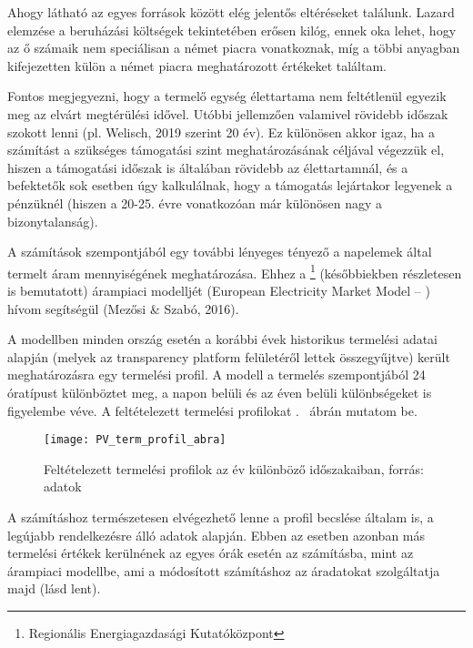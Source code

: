 \documentclass[twoside, magyar, showtrims]{corvinusphd}
\begin{document}

Ahogy látható az egyes források között
elég jelentős eltéréseket találunk.
Lazard elemzése a beruházási költségek
tekintetében erősen kilóg,
ennek oka lehet, hogy az ő számaik nem
speciálisan a német piacra vonatkoznak,
míg a többi anyagban kifejezetten külön
a német piacra meghatározott értékeket találtam. 

Fontos megjegyezni, hogy a termelő egység élettartama
nem feltétlenül egyezik meg az elvárt megtérülési idővel.
Utóbbi jellemzően valamivel rövidebb időszak
szokott lenni (pl. Welisch, 2019 szerint 20 év).
Ez különösen akkor igaz, ha a számítást a
szükséges támogatási szint meghatározásának céljával végezzük el,
hiszen a támogatási időszak is általában
rövidebb az élettartamnál, és a befektetők sok
esetben úgy kalkulálnak, hogy a támogatás lejártakor
legyenek a pénzüknél (hiszen a 20-25. évre vonatkozóan
már különösen nagy a bizonytalanság).

A számítások szempontjából egy további lényeges tényező a napelemek
által termelt áram mennyiségének meghatározása.
Ehhez a \footnote{Regionális Energiagazdasági Kutatóközpont}
(későbbiekben részletesen is bemutatott)
árampiaci modelljét (European Electricity Market Model -- )
hívom segítségül (Mezősi \& Szabó, 2016).

A modellben minden ország esetén a korábbi évek historikus termelési adatai alapján
(melyek az  transparency platform felületéről lettek összegyűjtve) került
meghatározásra egy termelési profil.
A modell a  termelés szempontjából 24 óratípust különböztet meg,
a napon belüli és az éven belüli különbségeket is figyelembe véve. 
A feltételezett termelési profilokat .~ ábrán mutatom be.

\begin{figure}
    \centering
    \texttt{[image: PV\_term\_profil\_abra]}
    \caption{Feltételezett termelési profilok az év különböző időszakaiban, forrás:  adatok}
    \label{fig:profilok}
\end{figure}

A számításhoz természetesen elvégezhető lenne a profil becslése általam is,
a legújabb rendelkezésre álló adatok alapján.
Ebben az esetben azonban más termelési értékek kerülnének
az egyes órák esetén az  számításba,
mint az árampiaci modellbe, ami a módosított  számításhoz
az áradatokat szolgáltatja majd (lásd lent).
\end{document}
